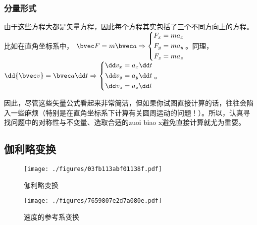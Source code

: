 \subsubsection{分量形式}
由于这些方程大都是矢量方程，因此每个方程其实包括了三个不同方向上的方程。比如在直角坐标系中，
$\bvec F = m \bvec a
\Rightarrow
\left \{
\begin{aligned}
F_x &= m a_x \\
F_y &= m a_y \\
F_z &= m a_z \\
\end{aligned}
\right .
$。同理，
$\dd {\bvec v} = \bvec a \dd t
\Rightarrow
\left \{
\begin{aligned}
\dd v_x &= a_x \dd t\\
\dd v_y &= a_y \dd t\\
\dd v_z &= a_z \dd t\\
\end{aligned}
\right .
$。

因此，尽管这些矢量公式看起来非常简洁，但如果你试图直接计算的话，往往会陷入一些麻烦（特别是在直角坐标系下计算有关圆周运动的问题！）。所以，认真寻找问题中的对称性与不变量、选取合适的zuoi biao x避免直接计算就尤为重要。

\subsection{伽利略变换}
\begin{figure}[ht]
\centering
\texttt{[image: ./figures/03fb113abf01138f.pdf]}
\caption{伽利略变换} \label{fig_MPAB_5}
\end{figure}

\begin{figure}[ht]
\centering
\texttt{[image: ./figures/7659807e2d7a080e.pdf]}
\caption{速度的参考系变换} \label{fig_MPAB_6}
\end{figure}

